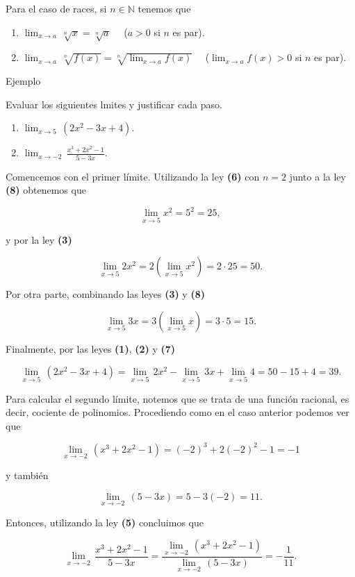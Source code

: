 \documentclass[
  letterpaper,
]{book}
\theoremstyle{plain}
\theoremstyle{remark}
\begin{document}
Para el caso de races, si \(n\in\mathbb{N}\) tenemos que

\begin{enumerate}
\def\labelenumi{\arabic{enumi}.}
\setcounter{enumi}{9}
\item
  \(\lim_{x\to a}\, \sqrt[n]{x}=\sqrt[n]{a}\quad\) (\(a>0\) si \(n\) es
  par).
\item
  \(\lim_{x\to a}\, \sqrt[n]{f(x)}=\sqrt[n]{\lim_{x\to a}f(x)}\quad\)
  (\(\lim_{x\to a} f(x)>0\) si \(n\) es par).
\end{enumerate}

Ejemplo

Evaluar los siguientes lmites y justificar cada paso.

\begin{enumerate}
\def\labelenumi{\arabic{enumi}.}
\item
  \(\lim_{x\to 5}\, (2x^2-3x+4)\).
\item
  \(\displaystyle \lim_{x\to -2}\, \frac{x^3+2x^2-1}{5-3x}\).
\end{enumerate}

\begin{tcolorbox}[enhanced jigsaw, opacityback=0, left=2mm, opacitybacktitle=0.6, toprule=.15mm, bottomrule=.15mm, colbacktitle=quarto-callout-tip-color!10!white, titlerule=0mm, bottomtitle=1mm, title=\textcolor{quarto-callout-tip-color}{\faLightbulb}\hspace{0.5em}{Solución}, toptitle=1mm, colframe=quarto-callout-tip-color-frame, colback=white, breakable, rightrule=.15mm, arc=.35mm, leftrule=.75mm, coltitle=black]

Comencemos con el primer límite. Utilizando la ley \textbf{(6)} con
\(n=2\) junto a la ley \textbf{(8)} obtenemos que

\[
\lim_{x\to 5} x^2 = 5^2 =25,
\]

y por la ley \textbf{(3)}

\[
\lim_{x\to 5} 2x^2 = 2\left(\lim_{x\to 5} x^2\right) =2\cdot 25=50.
\]

Por otra parte, combinando las leyes \textbf{(3)} y \textbf{(8)}

\[
\lim_{x\to 5} 3x = 3\left(\lim_{x\to 5} x\right) =3\cdot 5=15.
\]

Finalmente, por las leyes \textbf{(1)}, \textbf{(2)} y \textbf{(7)}

\[
\lim_{x\to 5}\, (2x^2-3x+4)=\lim_{x\to 5}\, 2x^2 - \lim_{x\to 5}\, 3x+ \lim_{x\to 5} 4 = 50-15+4=39.
\]

Para calcular el segundo límite, notemos que se trata de una función
racional, es decir, cociente de polinomios. Procediendo como en el caso
anterior podemos ver que

\[
\lim_{x\to -2}\, (x^3+2x^2-1) = (-2)^3+2(-2)^2-1=-1
\]

y también

\[
\lim_{x\to -2}\, (5-3x) = 5-3(-2)=11.
\]

Entonces, utilizando la ley \textbf{(5)} concluimos que

\[
\lim_{x\to -2}\, \frac{x^3+2x^2-1}{5-3x}=\frac{\lim_{x\to -2}\, (x^3+2x^2-1)}{\lim_{x\to -2}\, (5-3x)}=-\frac{1}{11}.
\]

\end{tcolorbox}
\end{document}
